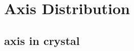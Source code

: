 \documentclass[compress]{beamer}
\begin{document}







\section{Axis Distribution}

\subsection*{axis in crystal}
\end{document}
